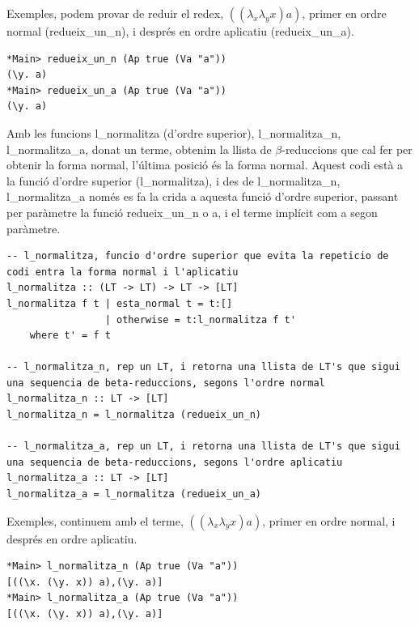 \documentclass[10pt,a4paper]{article}
\begin{document}
Exemples, podem provar de reduir el redex, $((\lambda_x \lambda_y x) a)$, primer en ordre normal (redueix\_un\_n), i després en ordre aplicatiu (redueix\_un\_a).

\lstset{language=Haskell, breaklines=true, basicstyle=\footnotesize}
\begin{lstlisting}[frame=mystyle]
*Main> redueix_un_n (Ap true (Va "a"))
(\y. a)
*Main> redueix_un_a (Ap true (Va "a"))
(\y. a)
\end{lstlisting}

\clearpage

Amb les funcions l\_normalitza (d'ordre superior), l\_normalitza\_n, l\_normalitza\_a, donat un terme, obtenim la llista de $\beta$-reduccions que cal fer per obtenir la forma normal, l'última posició és la forma normal. Aquest codi està a la funció d'ordre superior (l\_normalitza), i des de l\_normalitza\_n, l\_normalitza\_a només es fa la crida a aquesta funció d'ordre superior, passant per paràmetre la funció redueix\_un\_n o a, i el terme implícit com a segon paràmetre.

\lstset{language=Haskell, breaklines=true, basicstyle=\footnotesize}
\begin{lstlisting}[frame=mystyle]
-- l_normalitza, funcio d'ordre superior que evita la repeticio de codi entra la forma normal i l'aplicatiu
l_normalitza :: (LT -> LT) -> LT -> [LT]
l_normalitza f t | esta_normal t = t:[]
                 | otherwise = t:l_normalitza f t'
    where t' = f t

-- l_normalitza_n, rep un LT, i retorna una llista de LT's que sigui una sequencia de beta-reduccions, segons l'ordre normal
l_normalitza_n :: LT -> [LT]
l_normalitza_n = l_normalitza (redueix_un_n)

-- l_normalitza_a, rep un LT, i retorna una llista de LT's que sigui una sequencia de beta-reduccions, segons l'ordre aplicatiu
l_normalitza_a :: LT -> [LT]
l_normalitza_a = l_normalitza (redueix_un_a)
\end{lstlisting}

Exemples, continuem amb el terme, $((\lambda_x \lambda_y x) a)$, primer en ordre normal, i després en ordre aplicatiu.

\lstset{language=Haskell, breaklines=true, basicstyle=\footnotesize}
\begin{lstlisting}[frame=mystyle]
*Main> l_normalitza_n (Ap true (Va "a"))
[((\x. (\y. x)) a),(\y. a)]
*Main> l_normalitza_a (Ap true (Va "a"))
[((\x. (\y. x)) a),(\y. a)]
\end{lstlisting}
\end{document}
